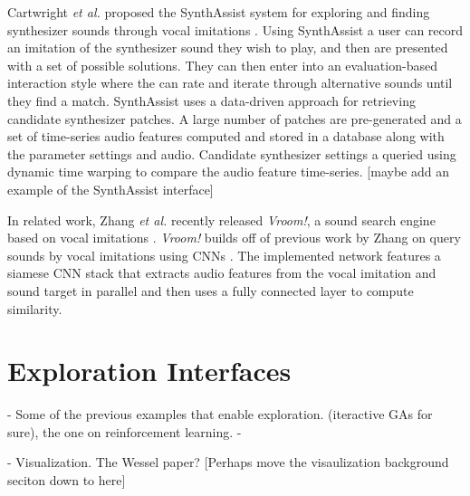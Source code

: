 Cartwright \textit{et al.} proposed the SynthAssist system for exploring and finding synthesizer sounds through vocal imitations \cite{cartwright2014synthassist}. Using SynthAssist a user can record an imitation of the synthesizer sound they wish to play, and then are presented with a set of possible solutions. They can then enter into an evaluation-based interaction style where the can rate and iterate through alternative sounds until they find a match. SynthAssist uses a data-driven approach for retrieving candidate synthesizer patches. A large number of patches are pre-generated and a set of time-series audio features computed and stored in a database along with the parameter settings and audio. Candidate synthesizer settings a queried using dynamic time warping to compare the audio feature time-series. [maybe add an example of the SynthAssist interface]


In related work, Zhang \textit{et al.} recently released \textit{Vroom!}, a sound search engine based on vocal imitations \cite{zhang2020vroom}. \textit{Vroom!} builds off of previous work by Zhang on query sounds by vocal imitations using CNNs \cite{zhang2017iminet, zhang2018visualization}. The implemented network features a siamese CNN stack that extracts audio features from the vocal imitation and sound target in parallel and then uses a fully connected layer to compute similarity.

\section{Exploration Interfaces}

- Some of the previous examples that enable exploration. (iteractive GAs for sure), the one on reinforcement learning.
- 

- Visualization. The Wessel paper? [Perhaps move the visaulization background seciton down to here]



